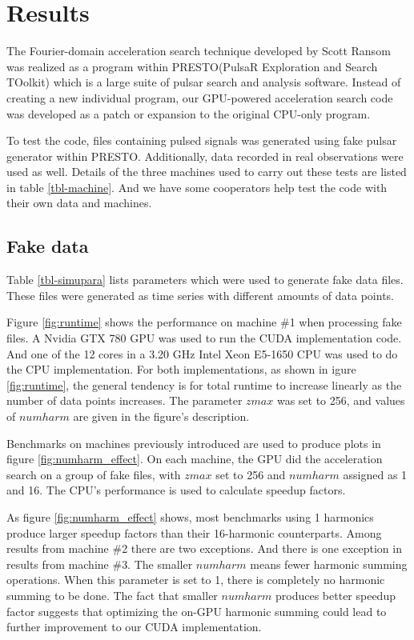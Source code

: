 \documentclass[preprint2]{aastex}
\begin{document}
\section{Results}
The Fourier-domain acceleration search technique developed by Scott Ransom was realized as a program within
PRESTO(PulsaR Exploration and Search TOolkit) which is a large suite of pulsar search and analysis software.
Instead of creating a new individual program,
our GPU-powered acceleration search code was developed as a patch or expansion to the original CPU-only program.

To test the code, files containing pulsed signals was generated using fake pulsar generator within PRESTO.
Additionally, data recorded in real observations were used as well. Details of the three machines 
used to carry out these tests are listed in table \ref{tbl-machine}. 
And we have some cooperators help test the code with their own data and machines.

\subsection{Fake data}
Table \ref{tbl-simupara} lists parameters which were used to generate fake data files. These files were 
generated as time series with different amounts of data points.

Figure \ref{fig:runtime} shows the performance on machine {\#}1 when processing fake files. A Nvidia GTX 780 GPU
was used to run the CUDA implementation code. And one of the 12 cores in a 3.20 GHz Intel Xeon 
E5-1650 CPU was used to do the CPU implementation. For both implementations, as shown in igure \ref{fig:runtime},
the general tendency is for total runtime to increase linearly as the number of data points increases. 
The parameter $zmax$ was set to 256, and values of $numharm$ are given in the figure's description.

Benchmarks on machines previously introduced are used to produce plots in figure \ref{fig:numharm_effect}. 
On each machine, the GPU did the acceleration search on a group of fake files, with $zmax$ set to 256 and 
$numharm$ assigned as 1 and 16. The CPU's performance is used to calculate speedup factors.

As figure \ref{fig:numharm_effect} shows, most benchmarks using 1 harmonics produce larger
speedup factors than their 16-harmonic counterparts. Among results from machine {\#}2 there are two exceptions.
And there is one exception in results from machine {\#}3. The smaller $numharm$ means fewer 
harmonic summing operations. When this parameter is set to 1, there is completely no harmonic summing
to be done. The fact that smaller $numharm$ produces better speedup factor suggests that optimizing the on-GPU harmonic 
summing could lead to further improvement to our CUDA implementation.
\end{document}
